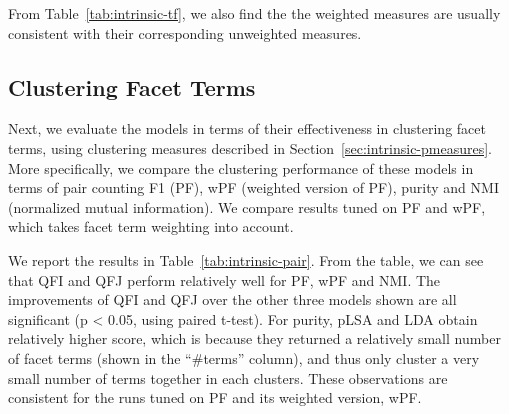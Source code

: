 From Table~\ref{tab:intrinsic-tf}, we also find the the weighted measures are usually consistent with their corresponding unweighted measures.

\subsection{Clustering Facet Terms}
Next, we evaluate the models in terms of their effectiveness in clustering facet terms, using clustering measures described in Section~\ref{sec:intrinsic-pmeasures}. More specifically, we compare the clustering performance of these models in terms of pair counting F1 (PF), wPF (weighted version of PF), purity and NMI (normalized mutual information). We compare results tuned on PF  and wPF, which takes facet term weighting into account.

We report the results in Table~\ref{tab:intrinsic-pair}. From the table, we can see that QFI and QFJ perform relatively well for PF, wPF and NMI. The improvements of QFI and QFJ over the other three models shown are all significant (p < 0.05, using paired t-test). For purity, pLSA and LDA obtain relatively higher score, which is because they returned a relatively small number of facet terms (shown in the ``\#terms'' column), and thus only cluster a very small number of terms together in each clusters.  These observations are consistent for the runs tuned on PF and its weighted version, wPF.


